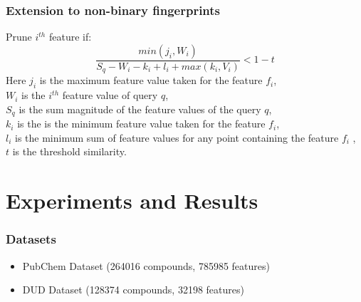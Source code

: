 \documentclass{beamer}
\begin{document}
\begin{frame}
\frametitle{Extension to non-binary fingerprints}
\begin{theorem}
Prune $i^{th}$ feature if:
\begin{equation}
\label{eq:boun3}
\frac{min(j_i,W_i)}{S_q - W_i -k_i+ l_i + max (k_i, V_i)}  < 1-t
\end{equation}
Here $j_i$ is the maximum feature value taken for the feature $f_i$,\\  $W_i$ is the $i^{th}$ feature value of query $q$,  \\$S_q$ is the sum magnitude of the feature values of the query $q$, \\ $k_i$ is the is the minimum feature value taken for the feature $f_i$,\\  $l_i$ is the minimum sum of feature values for any point containing the feature $f_i$ , \\ $t$ is the threshold similarity.
\end{theorem}	
\end{frame}

\section{Experiments and Results}
\begin{frame}
\frametitle{Datasets}
\begin{itemize}
	\item PubChem Dataset (264016 compounds, 785985 features)
	\item DUD Dataset (128374 compounds, 32198 features)
\end{itemize}

\end{frame}
\end{document}

